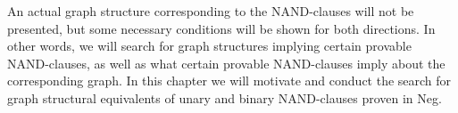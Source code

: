 An actual graph structure corresponding to the NAND-clauses will not be presented, but some necessary conditions will be shown for both directions.
In other words, we will search for graph structures implying certain provable NAND-clauses, as well as what certain provable NAND-clauses imply about the corresponding graph.
In this chapter we will motivate and conduct the search for graph structural equivalents of unary and binary NAND-clauses proven in Neg.
